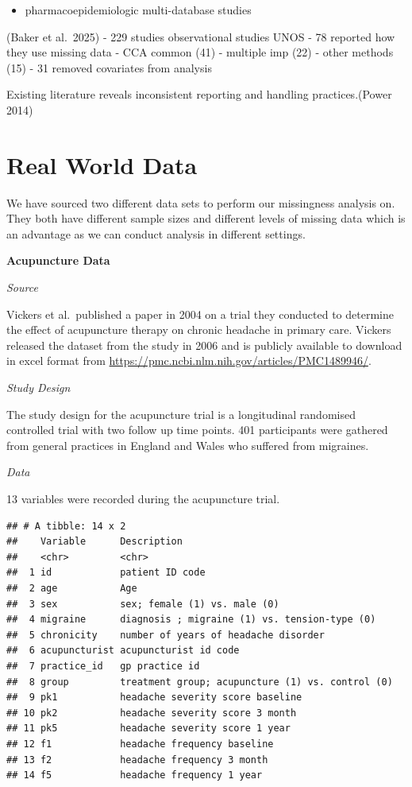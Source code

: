 \documentclass{article}
\providecommand{\tightlist}{%
  \setlength{\itemsep}{0pt}\setlength{\parskip}{0pt}}
\begin{document}
\begin{itemize}
\tightlist
\item
  pharmacoepidemiologic multi-database studies
\end{itemize}

(Baker et al.~2025) - 229 studies observational studies UNOS - 78
reported how they use missing data - CCA common (41) - multiple imp (22)
- other methods (15) - 31 removed covariates from analysis

Existing literature reveals inconsistent reporting and handling
practices.(Power 2014)

\section{Real World Data}\label{real-world-data}

We have sourced two different data sets to perform our missingness
analysis on. They both have different sample sizes and different levels
of missing data which is an advantage as we can conduct analysis in
different settings.

\textbf{Acupuncture Data}

\emph{Source}

Vickers et al.~published a paper in 2004 on a trial they conducted to
determine the effect of acupuncture therapy on chronic headache in
primary care. Vickers released the dataset from the study in 2006 and is
publicly available to download in excel format from
\url{https://pmc.ncbi.nlm.nih.gov/articles/PMC1489946/}.

\emph{Study Design}

The study design for the acupuncture trial is a longitudinal randomised
controlled trial with two follow up time points. 401 participants were
gathered from general practices in England and Wales who suffered from
migraines.

\emph{Data}

13 variables were recorded during the acupuncture trial.

\begin{verbatim}
## # A tibble: 14 x 2
##    Variable      Description                                     
##    <chr>         <chr>                                           
##  1 id            patient ID code                                 
##  2 age           Age                                             
##  3 sex           sex; female (1) vs. male (0)                    
##  4 migraine      diagnosis ; migraine (1) vs. tension-type (0)   
##  5 chronicity    number of years of headache disorder            
##  6 acupuncturist acupuncturist id code                           
##  7 practice_id   gp practice id                                  
##  8 group         treatment group; acupuncture (1) vs. control (0)
##  9 pk1           headache severity score baseline                
## 10 pk2           headache severity score 3 month                 
## 11 pk5           headache severity score 1 year                  
## 12 f1            headache frequency baseline                     
## 13 f2            headache frequency 3 month                      
## 14 f5            headache frequency 1 year
\end{verbatim}
\end{document}
